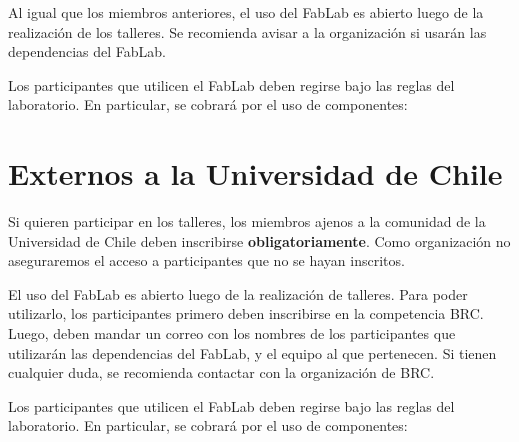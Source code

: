 Al igual que los miembros anteriores, el uso del FabLab es abierto luego de la realización de los talleres.
Se recomienda avisar a la organización si usarán las dependencias del FabLab.

Los participantes que utilicen el FabLab deben regirse bajo las reglas del laboratorio.
En particular, se cobrará por el uso de componentes:



\section{Externos a la Universidad de Chile}
Si quieren participar en los talleres, los miembros ajenos a la comunidad de la Universidad de Chile deben inscribirse \textbf{obligatoriamente}. 
Como organización no aseguraremos el acceso a participantes que no se hayan inscritos.

El uso del FabLab es abierto luego de la realización de talleres.
Para poder utilizarlo, los participantes primero deben inscribirse en la competencia BRC.
Luego, deben mandar un correo con los nombres de los participantes que utilizarán las dependencias del FabLab, y el equipo al que pertenecen.
Si tienen cualquier duda, se recomienda contactar con la organización de BRC.

Los participantes que utilicen el FabLab deben regirse bajo las reglas del laboratorio.
En particular, se cobrará por el uso de componentes:




